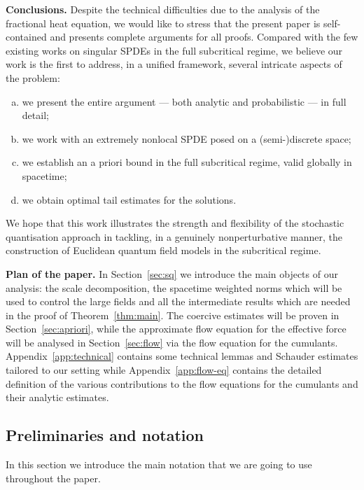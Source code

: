 \documentclass{article}
\numberwithin{equation}{section}
\theoremstyle{plain}
\theoremstyle{definition}
\begin{document}
{\noindent}{\textbf{Conclusions. }}Despite the technical difficulties due to
the analysis of the fractional heat equation, we would like to stress that the
present paper is self-contained and presents complete arguments for all
proofs. Compared with the few existing works on singular SPDEs in the full
subcritical regime, we believe our work is the first to address, in a unified
framework, several intricate aspects of the problem:
\begin{enumerate}[(a)]
  \item we present the entire argument --- both analytic and probabilistic ---
  in full detail;
  
  \item we work with an extremely nonlocal SPDE posed on a (semi-)discrete
  space;
  
  \item we establish an a priori bound in the full subcritical regime, valid
  globally in spacetime;
  
  \item we obtain optimal tail estimates for the solutions.
\end{enumerate}
We hope that this work illustrates the strength and flexibility of the
stochastic quantisation approach in tackling, in a genuinely nonperturbative
manner, the construction of Euclidean quantum field models in the subcritical
regime.{\medskip}

{\noindent}{\textbf{Plan of the paper. }}In Section~\ref{sec:sq} we introduce
the main objects of our analysis: the scale decomposition, the spacetime
weighted norms which will be used to control the large fields and all the
intermediate results which are needed in the proof of Theorem~\ref{thm:main}.
The coercive estimates will be proven in Section~\ref{sec:apriori}, while the
approximate flow equation for the effective force will be analysed in
Section~\ref{sec:flow} via the flow equation for the cumulants.
Appendix~\ref{app:technical} contains some technical lemmas and Schauder
estimates tailored to our setting while Appendix~\ref{app:flow-eq} contains
the detailed definition of the various contributions to the flow equations for
the cumulants and their analytic estimates.{\medskip}


\subsection{Preliminaries and notation}\label{sec:notations}

In this section we introduce the main notation that we are going to use
throughout the paper.
\end{document}
